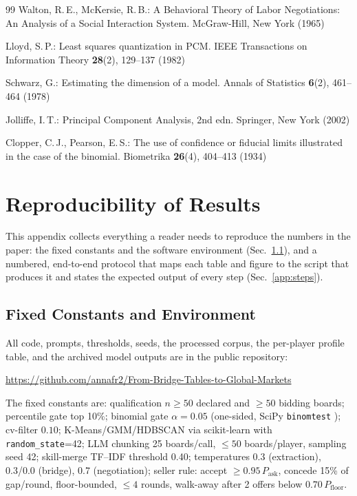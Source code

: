 \documentclass[runningheads]{llncs}
\begin{document}
\begin{thebibliography}{99}
Walton, R.\,E., McKersie, R.\,B.:
A Behavioral Theory of Labor Negotiations: An Analysis of a Social
Interaction System.
McGraw-Hill, New York (1965)

Lloyd, S.\,P.:
Least squares quantization in PCM.
IEEE Transactions on Information Theory \textbf{28}(2), 129--137 (1982)

Schwarz, G.:
Estimating the dimension of a model.
Annals of Statistics \textbf{6}(2), 461--464 (1978)

Jolliffe, I.\,T.:
Principal Component Analysis, 2nd edn.
Springer, New York (2002)

Clopper, C.\,J., Pearson, E.\,S.:
The use of confidence or fiducial limits illustrated in the case of the
binomial.
Biometrika \textbf{26}(4), 404--413 (1934)

\end{thebibliography}

\appendix
\section{Reproducibility of Results}\label{app:protocol}

This appendix collects everything a reader needs to reproduce the
numbers in the paper: the fixed constants and the software environment
(Sec.~\ref{app:constants}), and a numbered, end-to-end protocol that
maps each table and figure to the script that produces it and states
the expected output of every step (Sec.~\ref{app:steps}).

\subsection{Fixed Constants and Environment}\label{app:constants}

All code, prompts, thresholds, seeds, the processed corpus, the
per-player profile table, and the archived model outputs are in the
public repository:
\begin{center}\small
\url{https://github.com/annafr2/From-Bridge-Tables-to-Global-Markets}
\end{center}

The fixed constants are: qualification $n\ge50$ declared and $\ge50$
bidding boards; percentile gate top 10\%; binomial gate $\alpha=0.05$
(one-sided, SciPy \texttt{binomtest} \cite{virtanen2020scipy});
cv-filter $0.10$; K-Means/GMM/HDBSCAN via scikit-learn
\cite{pedregosa2011scikit} with \texttt{random\_state}=42; LLM chunking
25 boards/call, $\le50$ boards/player, sampling seed 42; skill-merge
TF--IDF threshold 0.40; temperatures 0.3 (extraction), 0.3/0.0 (bridge),
0.7 (negotiation); seller rule: accept $\ge0.95\,P_{\mathrm{ask}}$,
concede 15\% of gap/round, floor-bounded, $\le4$ rounds, walk-away after
2 offers below $0.70\,P_{\mathrm{floor}}$.
\end{document}
